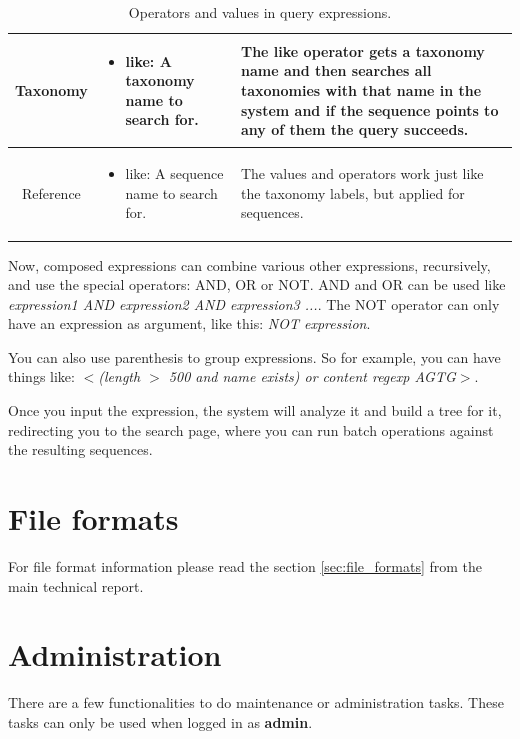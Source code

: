 \begin{table}[ht]
{\begin{tabular}{ | c | p{} | p{} |}
      Taxonomy & \begin{itemize}
        \item like: A taxonomy name to search for.
      \end{itemize} & The \textbf{like} operator gets a taxonomy name and then searches all taxonomies
      with that name in the system and if the sequence points to any of them the query succeeds. \\ \hline
      
      Reference & \begin{itemize}
        \item like: A sequence name to search for.
      \end{itemize} & The values and operators work just like the taxonomy labels, but applied for sequences. \\ \hline
  \end{tabular}}
  \caption{Operators and values in query expressions.}
  \label{tbl:operators_values_expressions}
\end{table}

Now, composed expressions can combine various other expressions, recursively, and use the special operators: AND, OR or NOT.
AND and OR can be used like \textit{expression1 AND expression2 AND expression3 ...}. The NOT operator can only have
an expression as argument, like this: \textit{NOT expression}.

You can also use parenthesis to group expressions. So for example, you can have things like:
$<$\textit{(length $>$ 500 and name exists) or content regexp AGTG}$>$.

Once you input the expression, the system will analyze it and build a tree for it, redirecting you to the search page,
where you can run batch operations against the resulting sequences.

\section{File formats}

For file format information please read the section \ref{sec:file_formats} from the main technical report.

\section{Administration}

There are a few functionalities to do maintenance or administration tasks.
These tasks can only be used when logged in as \textbf{admin}.

